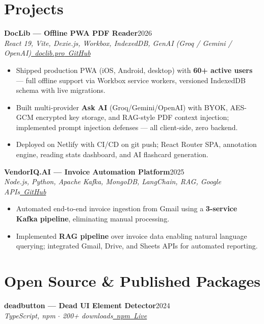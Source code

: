 \documentclass[letterpaper,10.5pt]{article}
\newcommand{\resumeSubheading}[4]{
  \vspace{2pt}
  {\small\textbf{#1}}\hfill{\small #4}\\[-1pt]
  {\footnotesize\textit{#3}}\hfill{\footnotesize\textit{#2}}\\[-5pt]
}
\newcommand{\resumeItem}[1]{\item\small{#1}}
\newcommand{\resumeItemListStart}{
  \begin{itemize}[leftmargin=1.1em, itemsep=0pt, topsep=2pt, parsep=0pt]
}
\newcommand{\resumeItemListEnd}{\end{itemize}\vspace{-1pt}}
\begin{document}
\vspace{4pt}
\vspace{4pt}
\vspace{4pt}
\section{Projects}

\resumeSubheading
{DocLib --- Offline PWA PDF Reader}{\href{https://doclib.pro}{\faGlobe\ doclib.pro}\enspace\href{https://github.com/nileshkr17}{\faGithub\ GitHub}}
{React 19, Vite, Dexie.js, Workbox, IndexedDB, GenAI (Groq / Gemini / OpenAI)}{2026}

\resumeItemListStart
  \resumeItem{Shipped production PWA (iOS, Android, desktop) with \textbf{60+ active users} --- full offline support via Workbox service workers, versioned IndexedDB schema with live migrations.}
  \resumeItem{Built multi-provider \textbf{Ask AI} (Groq/Gemini/OpenAI) with BYOK, AES-GCM encrypted key storage, and RAG-style PDF context injection; implemented prompt injection defenses --- all client-side, zero backend.}
  \resumeItem{Deployed on Netlify with CI/CD on git push; React Router SPA, annotation engine, reading stats dashboard, and AI flashcard generation.}
\resumeItemListEnd

\resumeSubheading
{VendorIQ.AI --- Invoice Automation Platform}{\href{https://github.com/BITSSAP2025AugAPIBP3Sections/APIBP-20242YA-Team-1}{\faGithub\ GitHub}}
{Node.js, Python, Apache Kafka, MongoDB, LangChain, RAG, Google APIs}{2025}

\resumeItemListStart
  \resumeItem{Automated end-to-end invoice ingestion from Gmail using a \textbf{3-service Kafka pipeline}, eliminating manual processing.}
  \resumeItem{Implemented \textbf{RAG pipeline} over invoice data enabling natural language querying; integrated Gmail, Drive, and Sheets APIs for automated reporting.}
\resumeItemListEnd

\vspace{4pt}
\vspace{4pt}
\vspace{4pt}
\section{Open Source \& Published Packages}

\resumeSubheading
{deadbutton --- Dead UI Element Detector}{\href{https://www.npmjs.com/package/deadbutton}{\faNpm\ npm}\enspace\href{https://deadbutton.netlify.app}{\faGlobe\ Live}}
{TypeScript, npm $\cdot$ 200+ downloads}{2024}
\end{document}
